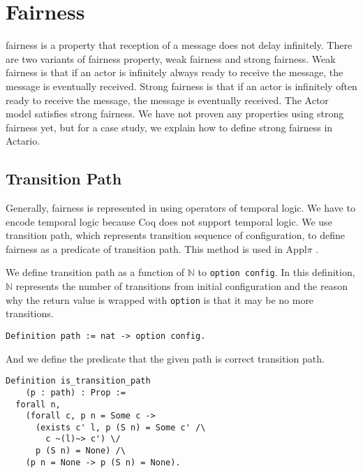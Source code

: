 \section{Fairness}
\label{sec:fairness}

\textsf{fairness} is a property that reception of a message does not delay infinitely.
There are two variants of fairness property, weak fairness and strong fairness.
Weak fairness is that if an actor is infinitely always ready to receive the message, the message is eventually received.
Strong fairness is that if an actor is infinitely often ready to receive the message, the message is eventually received.
The Actor model satisfies strong fairness.
We have not proven any properties using strong fairness yet, but for a case study, we explain how to define strong fairness in Actario.

\subsection{Transition Path}
Generally, fairness is represented in using operators of temporal logic.
We have to encode temporal logic because Coq does not support temporal logic.
We use transition path, which represents transition sequence of configuration, to define fairness as a predicate of transition path.
This method is used in Appl$\pi$ \cite{Affeldt200817}.

We define transition path as a function of $\mathbb{N}$ to \texttt{option config}.
In this definition, $\mathbb{N}$ represents the number of transitions from initial configuration and the reason why the return value is wrapped with \texttt{option} is that it may be no more transitions.

\begin{lstlisting}
Definition path := nat -> option config.
\end{lstlisting}

And we define the predicate that the given path is correct transition path.

\begin{lstlisting}
Definition is_transition_path
    (p : path) : Prop :=
  forall n,
    (forall c, p n = Some c ->
      (exists c' l, p (S n) = Some c' /\
        c ~(l)~> c') \/
      p (S n) = None) /\
    (p n = None -> p (S n) = None).
\end{lstlisting}

